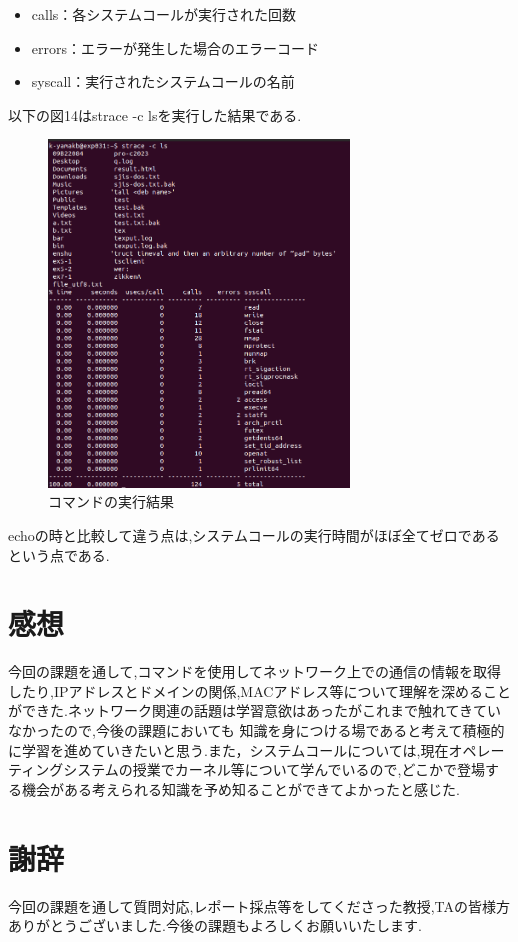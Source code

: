 \documentclass[dvipdfmx]{jarticle}
\begin{document}
\begin{enumerate}
\begin{itemize}
        \item calls：各システムコールが実行された回数
        \item errors：エラーが発生した場合のエラーコード
        \item syscall：実行されたシステムコールの名前
    \end{itemize}
    以下の図14はstrace -c lsを実行した結果である.
    \clearpage
    \begin{figure}[h]
        \centering
        \includegraphics[width=8cm]{1-3-12-1.png}
        \caption{コマンドの実行結果}
    \end{figure}
    echoの時と比較して違う点は,システムコールの実行時間がほぼ全てゼロであるという点である.
\end{enumerate}
\section{感想}
今回の課題を通して,コマンドを使用してネットワーク上での通信の情報を取得したり,IPアドレスとドメインの関係,MACアドレス等について理解を深めることができた.ネットワーク関連の話題は学習意欲はあったがこれまで触れてきていなかったので,今後の課題においても
知識を身につける場であると考えて積極的に学習を進めていきたいと思う.また，システムコールについては,現在オペレーティングシステムの授業でカーネル等について学んでいるので,どこかで登場する機会がある考えられる知識を予め知ることができてよかったと感じた.
\section{謝辞}
今回の課題を通して質問対応,レポート採点等をしてくださった教授,TAの皆様方ありがとうございました.今後の課題もよろしくお願いいたします.
\end{document}
